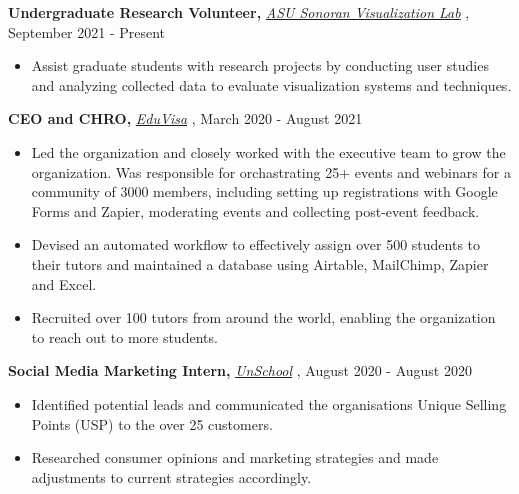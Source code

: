\documentclass[a4paper]{article}
\begin{document}
{\textbf{Undergraduate Research Volunteer, } \textit{\href{https://news.asu.edu/20200225-solutions-data-driven-quest-resilient-power-systems}{ASU Sonoran Visualization Lab} \faExternalLink}, \hfill September 2021 - Present\\
\vspace{-3mm}
\begin{itemize}
    \itemsep-0.05em
    \item Assist graduate students with research projects by conducting user studies and analyzing collected data to evaluate visualization systems and techniques. 
\end{itemize}

\textbf{CEO and CHRO, }\textit{{\href{https://myeduvisa.org/}{EduVisa}} \faExternalLink},   \hfill March 2020 - August 2021\\
\vspace{-3mm}
\begin{itemize} \itemsep 1pt
    \itemsep-0.05em
	\item Led the organization and closely worked with the executive team to grow the organization. Was responsible for orchastrating 25+ events and webinars for a community of 3000 members, including setting up registrations with Google Forms and Zapier, moderating events and collecting post-event feedback.
	\item Devised an automated workflow to effectively assign over 500 students to their tutors and maintained a database using Airtable, MailChimp, Zapier and Excel.
	\item Recruited over 100 tutors from around the world, enabling the organization to reach out to more students.
\end{itemize}



\textbf{Social Media Marketing Intern, }\textit{{\href{https://www.unschool.in/}{UnSchool}} \faExternalLink},  \hfill August 2020 - August 2020\\
\vspace{-3mm}
\begin{itemize} \itemsep 1pt
    \itemsep-0.05em
	\item Identified potential leads and communicated the organisation\textquotesingle{}s Unique Selling Points (USP) to the over 25 customers.
	\item Researched consumer opinions and marketing strategies and made adjustments to current strategies accordingly.
\end{itemize}

}
\end{document}

